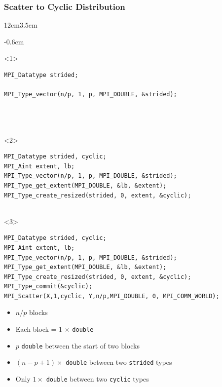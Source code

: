 \documentclass[xcolor={rgb,x11names,svgnames},rgb,x11names,svgnames]{beamer}
\newenvironment{wider}{%
\begin{adjustwidth}{-0.6cm}{}%
  \begin{minipage}{12cm}%
}{%
\end{minipage}%
\end{adjustwidth}%
}
\begin{document}

\begin{frame}[label=cyclic,fragile]
\frametitle{Scatter to Cyclic Distribution}

\begin{overlayarea}{12cm}{3.5cm}
\begin{wider}
  \begin{onlyenv}<1>
\begin{verbatim}
MPI_Datatype strided;

MPI_Type_vector(n/p, 1, p, MPI_DOUBLE, &strided);




\end{verbatim}
\end{onlyenv}

\begin{onlyenv}<2>
\begin{verbatim}
MPI_Datatype strided, cyclic;
MPI_Aint extent, lb;
MPI_Type_vector(n/p, 1, p, MPI_DOUBLE, &strided);
MPI_Type_get_extent(MPI_DOUBLE, &lb, &extent);
MPI_Type_create_resized(strided, 0, extent, &cyclic);


\end{verbatim}
\end{onlyenv}

\begin{onlyenv}<3>
\begin{verbatim}
MPI_Datatype strided, cyclic;
MPI_Aint extent, lb;
MPI_Type_vector(n/p, 1, p, MPI_DOUBLE, &strided);
MPI_Type_get_extent(MPI_DOUBLE, &lb, &extent);
MPI_Type_create_resized(strided, 0, extent, &cyclic);
MPI_Type_commit(&cyclic);
MPI_Scatter(X,1,cyclic, Y,n/p,MPI_DOUBLE, 0, MPI_COMM_WORLD);
\end{verbatim}
\end{onlyenv}
\end{wider}
\end{overlayarea}

\begin{itemize}
\item $n/p$ blocks
\item Each block = 1 $\times$ \texttt{double}
\item $p$ \texttt{double} between the start of two blocks
\item<only@1> $(n-p+1) \times$ \texttt{double} between two \texttt{strided} types
\item<only@2-> Only $1 \times$ \texttt{double} between two \texttt{cyclic} types
\end{itemize}


\end{frame}
\end{document}
